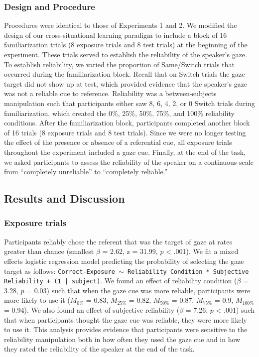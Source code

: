 \documentclass[authoryear, review]{elsarticle}
\begin{document}
\subsubsection{Design and Procedure}\label{design-and-procedure-2}

Procedures were identical to those of Experiments 1 and 2. We modified
the design of our cross-situational learning paradigm to include a block
of 16 familiarization trials (8 exposure trials and 8 test trials) at
the beginning of the experiment. These trials served to establish the
reliability of the speaker's gaze. To establish reliability, we varied
the proportion of Same/Switch trials that occurred during the
familiarization block. Recall that on Switch trials the gaze target did
not show up at test, which provided evidence that the speaker's gaze was
not a reliable cue to reference. Reliability was a between-subjects
manipulation such that participants either saw 8, 6, 4, 2, or 0 Switch
trials during familiarization, which created the 0\%, 25\%, 50\%, 75\%,
and 100\% reliability conditions. After the familiarization block,
participants completed another block of 16 trials (8 exposure trials and
8 test trials). Since we were no longer testing the effect of the
presence or absence of a referential cue, all exposure trials throughout
the experiment included a gaze cue. Finally, at the end of the task, we
asked participants to assess the reliability of the speaker on a
continuous scale from ``completely unreliable'' to ``completely
reliable.''

\subsection{Results and Discussion}\label{results-and-discussion-2}

\subsubsection{Exposure trials}\label{exposure-trials-2}

Participants reliably chose the referent that was the target of gaze at
rates greater than chance (smallest \(\beta\) = 2.62, z = 31.99, \(p\)
\textless{} .001). We fit a mixed effects logistic regression model
predicting the probability of selecting the gaze target as follows:
\texttt{Correct-Exposure $\sim$ Reliability Condition * Subjective Reliability + (1 | subject)}.
We found an effect of reliability condition (\(\beta\) = 3.28, \(p\) =
0.03) such that when the gaze cue was more reliable, participants were
more likely to use it (\(M_{0\%}\) = 0.83, \(M_{25\%}\) = 0.82,
\(M_{50\%}\) = 0.87, \(M_{75\%}\) = 0.9, \(M_{100\%}\) = 0.94). We also
found an effect of subjective reliability (\(\beta\) = 7.26, \(p\)
\textless{} .001) such that when participants thought the gaze cue was
reliable, they were more likely to use it. This analysis provides
evidence that participants were sensitive to the reliability
manipulation both in how often they used the gaze cue and in how they
rated the reliability of the speaker at the end of the task.
\end{document}
